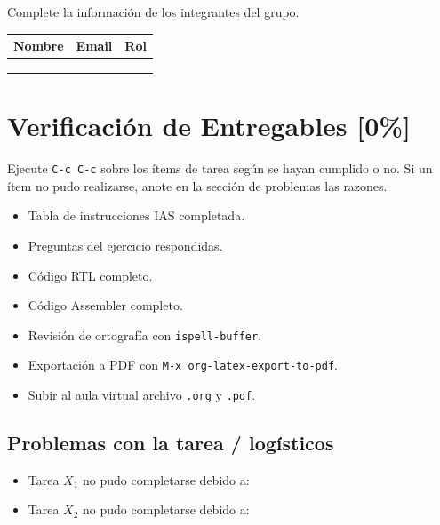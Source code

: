 \documentclass{article}
\begin{document}
Complete la información de los integrantes del grupo.

\begin{center}
\begin{tabular}{lll}
\hline
Nombre & Email & Rol\\[0pt]
\hline
 &  & \\[0pt]
 &  & \\[0pt]
 &  & \\[0pt]
\hline
\end{tabular}
\end{center}

\section{Verificación de Entregables [0\%]}
\label{sec:org10824d1}

Ejecute \texttt{C-c C-c} sobre los ítems de tarea según se hayan cumplido o
no. Si un ítem no pudo realizarse, anote en la sección de problemas
las razones.

\begin{itemize}
\item[{$\square$}] Tabla de instrucciones IAS completada.
\item[{$\square$}] Preguntas del ejercicio respondidas.
\item[{$\square$}] Código RTL completo.
\item[{$\square$}] Código Assembler completo.
\item[{$\square$}] Revisión de ortografía con \texttt{ispell-buffer}.
\item[{$\square$}] Exportación a PDF con \texttt{M-x org-latex-export-to-pdf}.
\item[{$\square$}] Subir al aula virtual archivo \texttt{.org} y \texttt{.pdf}.
\end{itemize}

\subsection{Problemas con la tarea / logísticos}
\label{sec:orge869d88}

\begin{itemize}
\item Tarea \(X_1\) no pudo completarse debido a:
\item Tarea \(X_2\) no pudo completarse debido a:
\end{itemize}

\printbibliography
\end{document}
